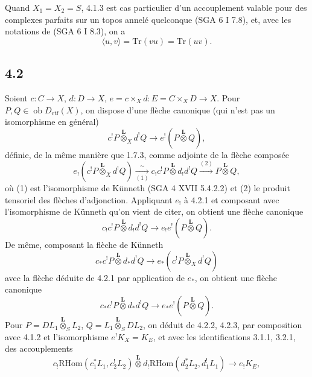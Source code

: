 \documentclass[11pt]{article}
\newcommand{\ob}{\operatorname{ob}}
\providecommand{\RHom}{\mathrm{RHom}}
\providecommand{\Dctf}{D_{\mathrm{ctf}}}
\providecommand{\Dctf}{D_{\mathrm{ctf}}}
\providecommand{\RHom}{\mathrm{RHom}}
\providecommand{\ob}{\operatorname{ob}}
\providecommand{\RHom}{\mathrm R\mathcal{H}om}
\providecommand{\RHom}{\mathrm{RHom}}
\begin{document}
Quand $X_1=X_2=S$, 4.1.3 est cas particulier d'un accouplement valable pour des complexes parfaits sur un topos annelé quelconque (SGA 6 I 7.8), et, avec les notations de (SGA 6 I 8.3), on a
\begin{equation}
\langle u,v\rangle=\mathrm{Tr}(vu)=\mathrm{Tr}(uv).
\tag{4.1.5}
\end{equation}

\subsection*{4.2}
Soient $c:C\to X$, $d:D\to X$, $e=c\times_Xd:E=C\times_XD\to X$. Pour $P,Q\in\ob\Dctf(X)$, on dispose d'une flèche canonique (qui n'est pas un isomorphisme en général)
\begin{equation}
c^!P\overset{\mathbf L}{\otimes}_X d^!Q
\longrightarrow e^!(P\overset{\mathbf L}{\otimes}Q),
\tag{4.2.1}
\end{equation}
définie, de la même manière que 1.7.3, comme adjointe de la flèche composée
\[
e_!(c^!P\overset{\mathbf L}{\otimes}_X d^!Q)
\xrightarrow[(1)]{\sim}
 c_!c^!P\overset{\mathbf L}{\otimes}d_!d^!Q
\xrightarrow{(2)} P\overset{\mathbf L}{\otimes}Q,
\]
où (1) est l'isomorphisme de Künneth (SGA 4 XVII 5.4.2.2) et (2) le produit tensoriel des flèches d'adjonction. Appliquant $e_!$ à 4.2.1 et composant avec l'isomorphisme de Künneth qu'on vient de citer, on obtient une flèche canonique
\begin{equation}
c_!c^!P\overset{\mathbf L}{\otimes}d_!d^!Q
\longrightarrow e_!e^!(P\overset{\mathbf L}{\otimes}Q).
\tag{4.2.2}
\end{equation}
De même, composant la flèche de Künneth
\[
c_*c^!P\overset{\mathbf L}{\otimes}d_*d^!Q
\longrightarrow e_*(c^!P\overset{\mathbf L}{\otimes}_X d^!Q)
\]
avec la flèche déduite de 4.2.1 par application de $e_*$, on obtient une flèche canonique
\begin{equation}
c_*c^!P\overset{\mathbf L}{\otimes}d_*d^!Q
\longrightarrow e_*e^!(P\overset{\mathbf L}{\otimes}Q).
\tag{4.2.3}
\end{equation}
Pour $P=DL_1\overset{\mathbf L}{\otimes}_S L_2$, $Q=L_1\overset{\mathbf L}{\otimes}_S DL_2$, on déduit de 4.2.2, 4.2.3, par composition avec 4.1.2 et l'isomorphisme $e^!K_X=K_E$, et avec les identifications 3.1.1, 3.2.1, des accouplements
\begin{equation}
c_!\RHom(c_1^*L_1,c_2^!L_2)\overset{\mathbf L}{\otimes}
 d_!\RHom(d_2^*L_2,d_1^!L_1)
\longrightarrow e_!K_E,
\tag{4.2.4}
\end{equation}
\end{document}
